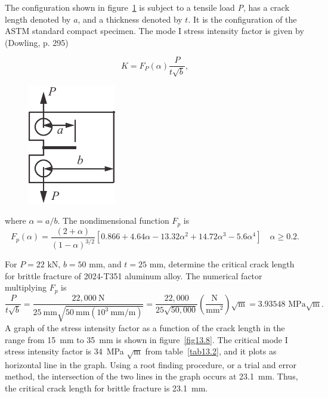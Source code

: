 \documentclass{AeroStructure-ERJohnson}
\begin{document}
\begin{example}\label{ex13.1}The configuration shown in figure~\ref{fig13.7} is subject to a tensile load \textit{P}, has a crack length denoted by $a$, and a thickness denoted by $t$. It is the configuration of the ASTM standard compact specimen. The mode I stress intensity factor is given by (Dowling, p. 295\vadjust{\vspace*{6pt}\pagebreak})

\begin{equation}
K=F_{P}(\alpha) \frac{P}{t \sqrt{b}}, \label{eq13.1.a}\tag{a}
\end{equation}

\vspace*{-1pc}

\begin{figure}
\vspace{-5pc}
\includegraphics{Figure_13-7.pdf}
\caption{ \label{fig13.7}}
\end{figure}

\noindent where $\alpha=a/b$. The nondimensional function $F_p$ is
\begin{equation}
F_{p}(\alpha)=\frac{(2+\alpha)}{(1-\alpha)^{3 / 2}}\left[0.866+4.64 \alpha-13.32 \alpha^{2}+14.72 \alpha^{3}-5.6 \alpha^{4}\right] \quad \alpha \geq 0.2. \label{eq13.1.b}\tag{b}
\end{equation}

For $P=22 \textrm{~kN}$, $b= 50$ mm, and $t= 25$ mm, determine the critical crack length for brittle fracture of 2024-T351 aluminum alloy. The numerical factor multiplying $F_p$ is
\begin{equation}
\frac{P}{t \sqrt{b}}=\frac{22{,}000 \mathrm{~N}}{25 \mathrm{~mm} \sqrt{50 \mathrm{~mm}\left(10^{3} \mathrm{~mm} / \mathrm{m}\right)}}=\frac{22{,}000}{25 \sqrt{50{,}000}}\left(\frac{\mathrm{N}}{\mathrm{mm}^{2}}\right) \sqrt{\mathrm{m}}=3.93548 \textrm{ MPa} \sqrt{\mathrm{m}}. \label{eq13.1.c}\tag{c}
\end{equation}
A graph of the stress intensity factor as a function of the crack length in the range from 15~mm to 35~mm is shown in figure~\ref{fig13.8}. The critical mode I stress intensity factor is 34~MPa $\sqrt{\mathrm{m}}$ from table~\ref{tab13.2}, and it plots as horizontal line in the graph. Using a root finding procedure, or a trial and error method, the intersection of the two lines in the graph occurs at 23.1~mm. Thus, the critical crack length for brittle fracture is 23.1~mm.
\end{example}
\end{document}
